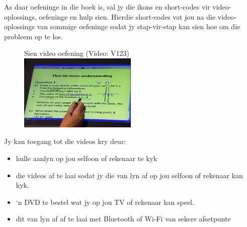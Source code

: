 {

As daar oefeninge in die boek is, sal jy die ikons en short-codes vir video-oplossings, oefeninge en hulp sien. Hierdie short-codes vat jou na die video-oplossings van sommige oefeninge sodat jy stap-vir-stap kan sien hoe om die probleem op te los. \par

\begin{figure}[h]
\begin{center}
Sien video oefening  (Video: V123)\\ 
\includegraphics[width=0.5\textwidth]{title_images/mindsetexercise.png}
\end{center}
\end{figure}
Jy kan toegang tot die videos kry deur:
\begin{itemize}
\item hulle aanlyn op jou selfoon of rekenaar te kyk
\item die videos af te laai sodat jy die van lyn af op jou selfoon of rekenaar kan kyk.
\item ‘n DVD te bestel wat jy op jou TV of rekenaar kan speel.
\item dit van lyn af af te laai met Bluetooth of Wi-Fi van sekere afsetpunte
\end{itemize}
}


